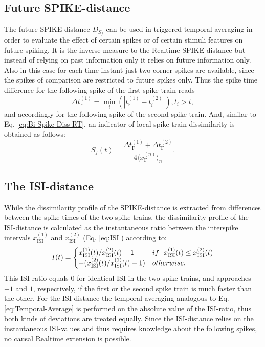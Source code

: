 \documentclass[10pt,twocolumn]{elsart5p}
\begin{document}
\subsection{\label{ss:Future-Spike-Distance} Future SPIKE-distance}

The future SPIKE-distance $D_{S_f}$ can be used in triggered temporal averaging in order to evaluate the effect of certain spikes or of certain stimuli features on future spiking. It is the inverse measure to the Realtime SPIKE-distance but instead of relying on past information only it relies on future information only. Also in this case for each time instant just two corner spikes are available, since the spikes of comparison are restricted to future spikes only. Thus the spike time difference for the following spike of the first spike train reads
%
\begin{equation} \label{eq:Delta-Corner-Spike-Future}
     \Delta t_{\mathrm {F}}^{(1)} = \min_i (| t_{\mathrm {F}}^{(1)} - t_i^{(2)} |), t_i > t,
\end{equation}
%
and accordingly for the following spike of the second spike train. And, similar to Eq. \ref{eq:Bi-Spike-Diss-RT}, an indicator of local spike train dissimilarity is obtained as follows:
%
\begin{equation} \label{eq:Bi-Spike-Diss-FT}
    S_f (t) = \frac{ \Delta t_{\mathrm {F}}^{(1)} + \Delta t_{\mathrm {F}}^{(2)}} {4 \langle x_{\mathrm {F}}^{(n)} \rangle_n}.
\end{equation}


\subsection{\label{ss:Bivariate-ISI-Distance} The ISI-distance}

While the dissimilarity profile of the SPIKE-distance is extracted from differences between the spike times of the two spike trains, the dissimilarity profile of the ISI-distance \citep{Kreuz07c, Kreuz09} is calculated as the instantaneous ratio between the interspike intervals $x_{\mathrm {ISI}}^{(1)}$ and $x_{\mathrm {ISI}}^{(2)}$ (Eq. \ref{eq:ISI}) according to:
%
\begin{equation} \label{eq:ISI-Ratio}
    I (t) = \begin{cases}
           x_{\mathrm {ISI}}^{(1)} (t) / x_{\mathrm {ISI}}^{(2)} (t) - 1 & {\rm if} ~~ x_{\mathrm {ISI}}^{(1)} (t) \leq x_{\mathrm {ISI}}^{(2)} (t) \cr
                      - (x_{\mathrm {ISI}}^{(2)} (t) / x_{\mathrm {ISI}}^{(1)} (t) -1)     & {\rm otherwise}.
                  \end{cases}
\end{equation}
%
This ISI-ratio equals $0$ for identical ISI in the two spike trains, and approaches $-1$ and $1$, respectively, if the first or the second spike train is much faster than the other. For the ISI-distance the temporal averaging analogous to Eq. \ref{eq:Temporal-Average} is performed on the absolute value of the ISI-ratio, thus both kinds of deviations are treated equally. Since the ISI-distance relies on the instantaneous ISI-values and thus requires knowledge about the following spikes, no causal Realtime extension is possible.
\end{document}
